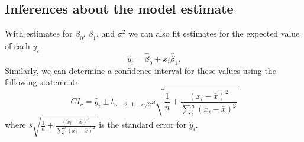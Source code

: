 \documentclass{article}
\begin{document}
\subsection{Inferences about the model estimate}
With estimates for \(\beta_0\), \(\beta_1\), and \(\sigma^2\) we can also fit estimates for
the expected value of each \(y_i\)
\begin{equation*}
    \hat{y}_i = \hat{\beta}_0 + x_i \hat{\beta}_1.
\end{equation*}
Similarly, we can determine a confidence interval for these values using the following statement:
\begin{equation*}
    CI_c = \hat{y}_i \pm t_{n-2,\: 1-\alpha/2} s \sqrt{\frac{1}{n} + \frac{\left( x_i - \overline{x} \right)^2}{\sum_i^n \left( x_i - \overline{x} \right)^2}}
\end{equation*}
where \(s\sqrt{\frac{1}{n} + \frac{\left( x_i - \overline{x} \right)^2}{\sum_i^n \left( x_i - \overline{x} \right)^2}}\)
is the standard error for \(\hat{y}_i\).
\end{document}
